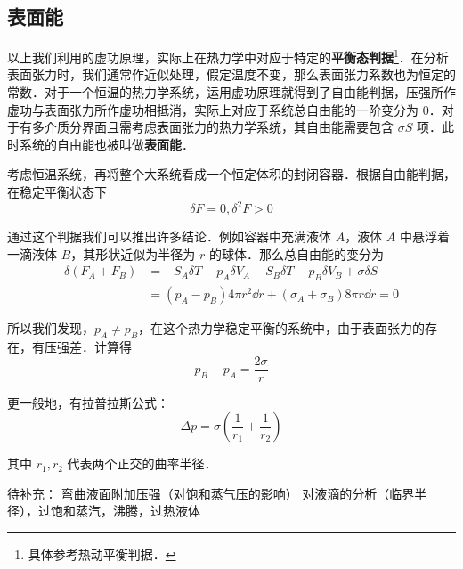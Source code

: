 \subsection{表面能}
以上我们利用的虚功原理，实际上在热力学中对应于特定的\textbf{平衡态判据}\footnote{具体参考热动平衡判据．}．在分析表面张力时，我们通常作近似处理，假定温度不变，那么表面张力系数也为恒定的常数．对于一个恒温的热力学系统，运用虚功原理就得到了自由能判据，压强所作虚功与表面张力所作虚功相抵消，实际上对应于系统总自由能的一阶变分为 $0$．对于有多介质分界面且需考虑表面张力的热力学系统，其自由能需要包含 $\sigma S$ 项．此时系统的自由能也被叫做\textbf{表面能}．

考虑恒温系统，再将整个大系统看成一个恒定体积的封闭容器．根据自由能判据，在稳定平衡状态下
\begin{equation}
\delta F=0,\delta^2 F>0
\end{equation}

通过这个判据我们可以推出许多结论．例如容器中充满液体 $A$，液体 $A$ 中悬浮着一滴液体 $B$，其形状近似为半径为 $r$ 的球体．那么总自由能的变分为
\begin{align}
\delta(F_A+F_B)&=-S_A\delta T-p_A\delta V_A-S_B\delta T-p_B\delta V_B+\sigma\delta S\\
&=(p_A-p_B)4\pi r^2\dd r + (\sigma_A+\sigma_B)8\pi r\dd r=0
\end{align}

所以我们发现，$p_A\neq p_B$，在这个热力学稳定平衡的系统中，由于表面张力的存在，有压强差．计算得
\begin{equation}
p_B-p_A=\frac{2\sigma}{r}
\end{equation}

更一般地，有拉普拉斯公式：
\begin{equation}\label{sftens_eq1}
\Delta p = \sigma \left(\frac{1}{r_1}+\frac{1}{r_2}\right)
\end{equation}

其中 $r_1,r_2$ 代表两个正交的曲率半径．

待补充：
弯曲液面附加压强（对饱和蒸气压的影响）
对液滴的分析（临界半径），过饱和蒸汽，沸腾，过热液体